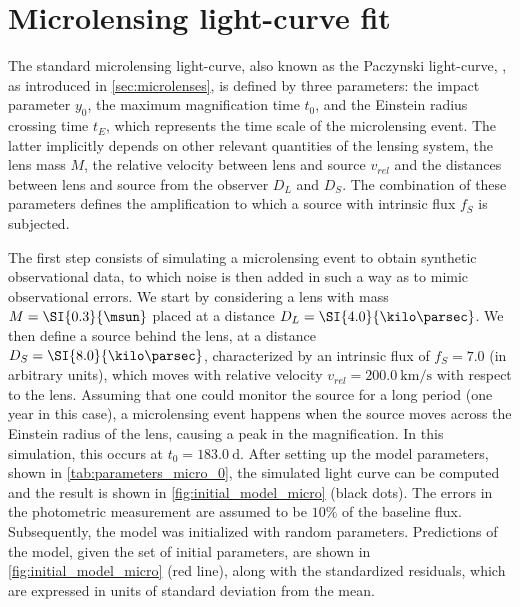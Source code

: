 \section{Microlensing light-curve fit}
\label{sec:fit_micro}

The standard microlensing light-curve, also known as the Paczynski light-curve, \citep{paczynski_gravitational_1986}, as introduced in \cref{sec:microlenses}, is defined by three parameters: the impact parameter $y_0$, the maximum magnification time $t_0$, and the Einstein radius crossing time $t_E$, which represents the time scale of the microlensing event. The latter implicitly depends on other relevant quantities of the lensing system, the lens mass $M$, the relative velocity between lens and source $v_{rel}$ and the distances between lens and source from the observer $D_L$ and $D_S$. The combination of these parameters defines the amplification to which a source with intrinsic flux $f_S$ is subjected.

The first step consists of simulating a microlensing event to obtain synthetic observational data, to which noise is then added in such a way as to mimic observational errors. We start by considering a lens with mass $M = \SI{0.3}{\msun}$ placed at a distance $D_L = \SI{4.0}{\kilo\parsec}$. We then define a source behind the lens, at a distance $D_S = \SI{8.0}{\kilo\parsec}$, characterized by an intrinsic flux of $f_S = 7.0$ (in arbitrary units), which moves with relative velocity $v_{rel} = \SI{200.0}{\kilo\meter\per\second}$ with respect to the lens. Assuming that one could monitor the source for a long period (one year in this case), a microlensing event happens when the source moves across the Einstein radius of the lens, causing a peak in the magnification. In this simulation, this occurs at $t_0 = \SI{183.0}{\day}$. After setting up the model parameters, shown in \cref{tab:parameters_micro_0}, the simulated light curve can be computed and the result is shown in \cref{fig:initial_model_micro} (black dots). The errors in the photometric measurement are assumed to be $10\%$ of the baseline flux.
Subsequently, the model was initialized with random parameters. Predictions of the model, given the set of initial parameters, are shown in \cref{fig:initial_model_micro} (red line), along with the standardized residuals, which are expressed in units of standard deviation from the mean.

